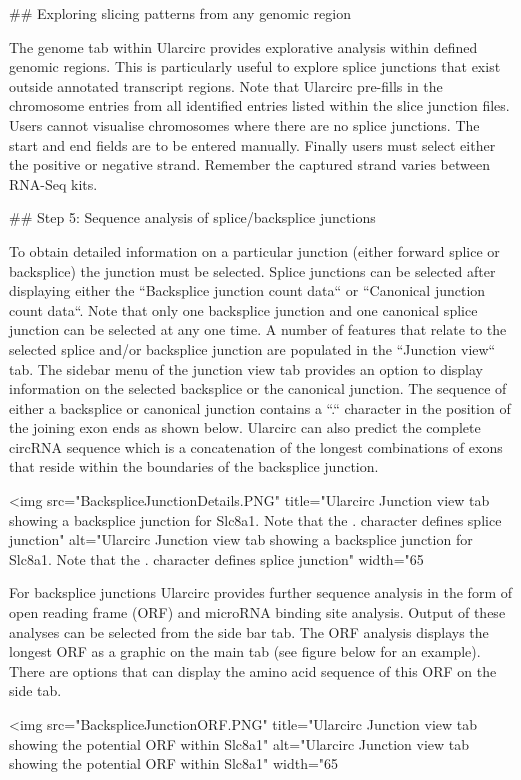 ## Exploring slicing patterns from any genomic region

The genome tab within Ularcirc provides explorative analysis within defined genomic regions. This is particularly useful to explore splice junctions that exist outside annotated transcript regions. Note that Ularcirc pre-fills in the chromosome entries from all identified entries listed within the slice junction files. Users cannot visualise chromosomes where there are no splice junctions. The start and end fields are to be entered manually. Finally users must select either the positive or negative strand. Remember the captured strand varies between RNA-Seq kits.

## Step 5: Sequence analysis of splice/backsplice junctions

To obtain detailed information on a particular junction (either forward splice or backsplice) the junction must be selected. Splice junctions can be selected after displaying either the ``Backsplice junction count data`` or ``Canonical junction count data``. Note that only one backsplice junction and one canonical splice junction can be selected at any one time. A number of features that relate to the selected splice and/or backsplice junction are populated in the ``Junction view`` tab. The sidebar menu of the junction view tab provides an option to display information on the selected backsplice or the canonical junction. The sequence of either a backsplice or canonical junction contains a ``.`` character in the position of the joining exon ends as shown below. Ularcirc can also predict the complete circRNA sequence which is a concatenation of the longest combinations of exons that reside within the boundaries of the backsplice junction. 

<img src="BackspliceJunctionDetails.PNG" title="Ularcirc Junction view tab showing a backsplice junction for Slc8a1. Note that the . character defines splice junction" alt="Ularcirc Junction view tab showing a backsplice junction for Slc8a1. Note that the . character defines splice junction" width="65%

For backsplice junctions Ularcirc provides further sequence analysis in the form of open reading frame (ORF) and microRNA binding site analysis. Output of these analyses can be selected from the side bar tab. The ORF analysis displays the longest ORF as a graphic on the main tab (see figure below for an example). There are options that can display the amino acid sequence of this ORF on the side tab.

<img src="BackspliceJunctionORF.PNG" title="Ularcirc Junction view tab showing the potential ORF within Slc8a1" alt="Ularcirc Junction view tab showing the potential ORF within Slc8a1" width="65%

